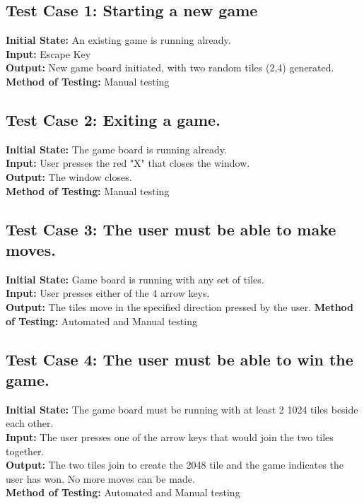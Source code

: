 \documentclass[12pt]{article}
\begin{document}
\subsection{Test Case 1: Starting a new game} 

\textbf{Initial State:} An existing game is running already. \\
\textbf{Input:} Escape Key\\
\textbf{Output:} New game board initiated, with two random tiles (2,4) generated. 
\textbf{Method of Testing:} Manual testing

\subsection{Test Case 2: Exiting a game.}

\textbf{Initial State:} The game board is running already.\\
\textbf{Input:} User presses the red "X" that closes the window.\\
\textbf{Output:} The window closes. \\
\textbf{Method of Testing:} Manual testing

\subsection{Test Case 3: The user must be able to make moves.}

\textbf{Initial State:} Game board is running with any set of tiles.\\
\textbf{Input:} User presses either of the 4 arrow keys.\\
\textbf{Output:} The tiles move in the specified direction pressed by the user.
\textbf{Method of Testing:} Automated and Manual testing

\subsection{Test Case 4: The user must be able to win the game.}

\textbf{Initial State:} The game board must be running with at least 2 1024 tiles beside 
each other.\\
\textbf{Input:} The user presses one of the arrow keys that would join the two tiles 
together.\\
\textbf{Output:} The two tiles join to create the 2048 tile and the game indicates the 
user has won. No more moves can be made.\\
\textbf{Method of Testing:} Automated and Manual testing
\end{document}
